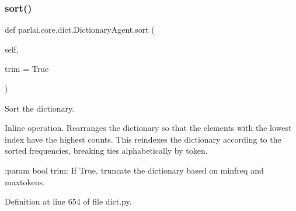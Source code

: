 \subsubsection{\texorpdfstring{sort()}{sort()}}
{\footnotesize\ttfamily def parlai.\+core.\+dict.\+Dictionary\+Agent.\+sort (\begin{DoxyParamCaption}\item[{}]{self,  }\item[{}]{trim = {\ttfamily True} }\end{DoxyParamCaption})}

\begin{DoxyVerb}Sort the dictionary.

Inline operation. Rearranges the dictionary so that the elements with
the lowest index have the highest counts. This reindexes the dictionary
according to the sorted frequencies, breaking ties alphabetically by
token.

:param bool trim:
    If True, truncate the dictionary based on minfreq and maxtokens.
\end{DoxyVerb}
 

Definition at line 654 of file dict.\+py.



